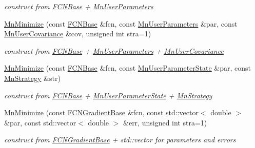 \begin{DoxyCompactItemize}
\begin{DoxyCompactList}\small\item\em construct from \mbox{\hyperlink{classROOT_1_1Minuit2_1_1FCNBase}{F\+C\+N\+Base}} + \mbox{\hyperlink{classROOT_1_1Minuit2_1_1MnUserParameters}{Mn\+User\+Parameters}} \end{DoxyCompactList}\item 
\mbox{\hyperlink{classROOT_1_1Minuit2_1_1MnMinimize_a0f9bbcbd7bd87cb2f613f8d01ef49d86}{Mn\+Minimize}} (const \mbox{\hyperlink{classROOT_1_1Minuit2_1_1FCNBase}{F\+C\+N\+Base}} \&fcn, const \mbox{\hyperlink{classROOT_1_1Minuit2_1_1MnUserParameters}{Mn\+User\+Parameters}} \&par, const \mbox{\hyperlink{classROOT_1_1Minuit2_1_1MnUserCovariance}{Mn\+User\+Covariance}} \&cov, unsigned int stra=1)
\begin{DoxyCompactList}\small\item\em construct from \mbox{\hyperlink{classROOT_1_1Minuit2_1_1FCNBase}{F\+C\+N\+Base}} + \mbox{\hyperlink{classROOT_1_1Minuit2_1_1MnUserParameters}{Mn\+User\+Parameters}} + \mbox{\hyperlink{classROOT_1_1Minuit2_1_1MnUserCovariance}{Mn\+User\+Covariance}} \end{DoxyCompactList}\item 
\mbox{\hyperlink{classROOT_1_1Minuit2_1_1MnMinimize_ac07d9fb89fb1a8cdef14ece12eabbfda}{Mn\+Minimize}} (const \mbox{\hyperlink{classROOT_1_1Minuit2_1_1FCNBase}{F\+C\+N\+Base}} \&fcn, const \mbox{\hyperlink{classROOT_1_1Minuit2_1_1MnUserParameterState}{Mn\+User\+Parameter\+State}} \&par, const \mbox{\hyperlink{classROOT_1_1Minuit2_1_1MnStrategy}{Mn\+Strategy}} \&str)
\begin{DoxyCompactList}\small\item\em construct from \mbox{\hyperlink{classROOT_1_1Minuit2_1_1FCNBase}{F\+C\+N\+Base}} + \mbox{\hyperlink{classROOT_1_1Minuit2_1_1MnUserParameterState}{Mn\+User\+Parameter\+State}} + \mbox{\hyperlink{classROOT_1_1Minuit2_1_1MnStrategy}{Mn\+Strategy}} \end{DoxyCompactList}\item 
\mbox{\hyperlink{classROOT_1_1Minuit2_1_1MnMinimize_a838683666517f1099a8eff7654dff3e2}{Mn\+Minimize}} (const \mbox{\hyperlink{classROOT_1_1Minuit2_1_1FCNGradientBase}{F\+C\+N\+Gradient\+Base}} \&fcn, const std\+::vector$<$ double $>$ \&par, const std\+::vector$<$ double $>$ \&err, unsigned int stra=1)
\begin{DoxyCompactList}\small\item\em construct from \mbox{\hyperlink{classROOT_1_1Minuit2_1_1FCNGradientBase}{F\+C\+N\+Gradient\+Base}} + std\+::vector for parameters and errors \end{DoxyCompactList}\item 

\end{DoxyCompactItemize}
